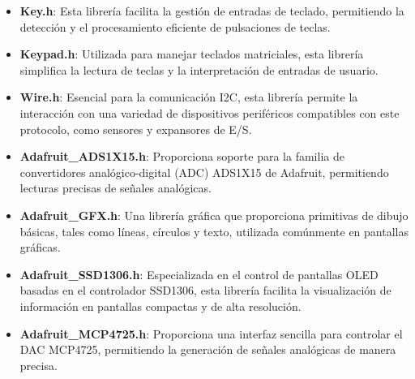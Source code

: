 \begin{itemize}
    \item \textbf{Key.h}: Esta librería facilita la gestión de entradas de teclado, permitiendo la detección y el procesamiento eficiente de pulsaciones de teclas.
    \item \textbf{Keypad.h}: Utilizada para manejar teclados matriciales, esta librería simplifica la lectura de teclas y la interpretación de entradas de usuario.
    \item \textbf{Wire.h}: Esencial para la comunicación I2C, esta librería permite la interacción con una variedad de dispositivos periféricos compatibles con este protocolo, como sensores y expansores de E/S.
    \item \textbf{Adafruit\_ADS1X15.h}: Proporciona soporte para la familia de convertidores analógico-digital (ADC) ADS1X15 de Adafruit, permitiendo lecturas precisas de señales analógicas.
    \item \textbf{Adafruit\_GFX.h}: Una librería gráfica que proporciona primitivas de dibujo básicas, tales como líneas, círculos y texto, utilizada comúnmente en pantallas gráficas.
    \item \textbf{Adafruit\_SSD1306.h}: Especializada en el control de pantallas OLED basadas en el controlador SSD1306, esta librería facilita la visualización de información en pantallas compactas y de alta resolución.
    \item \textbf{Adafruit\_MCP4725.h}: Proporciona una interfaz sencilla para controlar el DAC MCP4725, permitiendo la generación de señales analógicas de manera precisa.
\end{itemize}

